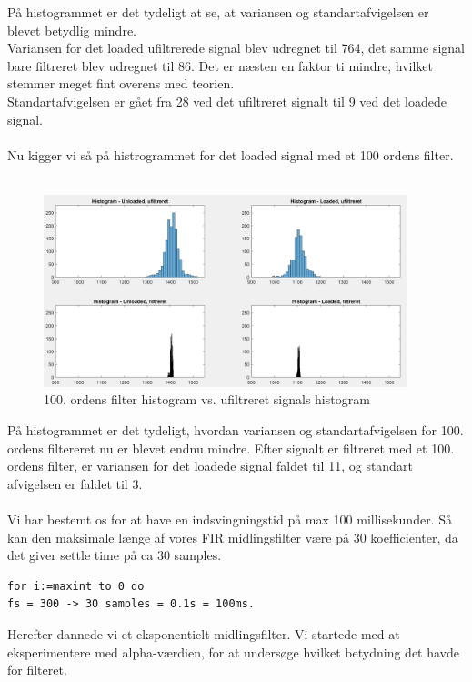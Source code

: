 På histogrammet er det tydeligt at se, at variansen og standartafvigelsen er blevet betydlig mindre. \\
Variansen for det loaded ufiltrerede signal blev udregnet til 764, det samme signal bare filtreret blev udregnet til 86. Det er næsten en faktor ti mindre, hvilket stemmer meget fint overens med teorien. \\
Standartafvigelsen er gået fra 28 ved det ufiltreret signalt til 9 ved det loadede signal. \\
\\
Nu kigger vi så på histrogrammet for det loaded signal med et 100 ordens filter. \\
\\
\begin{figure}[H]
	\centering
	\includegraphics[width = 300pt]{Img/Histogram_100_orden.PNG}
	\caption{100. ordens filter histogram vs. ufiltreret signals histogram}
	\label{fig:Histogram_100_orden}
\end{figure}
På histogrammet er det tydeligt, hvordan variansen og standartafvigelsen for 100. ordens filtereret nu er blevet endnu mindre.
Efter signalt er filtreret med et 100. ordens filter, er variansen for det loadede signal faldet til 11, og standart afvigelsen er faldet til 3. \\
\\
Vi har bestemt os for at have en indsvingningstid på max 100 millisekunder. Så kan den maksimale længe af vores FIR midlingsfilter være på 30 koefficienter, da det giver settle time på ca 30 samples.
\begin{lstlisting}[frame=single]  % Start your code-block
for i:=maxint to 0 do
fs = 300 -> 30 samples = 0.1s = 100ms.
\end{lstlisting}

Herefter dannede vi et eksponentielt midlingsfilter. Vi startede med at eksperimentere med alpha-værdien, for at undersøge hvilket betydning det havde for filteret.\\
\\

